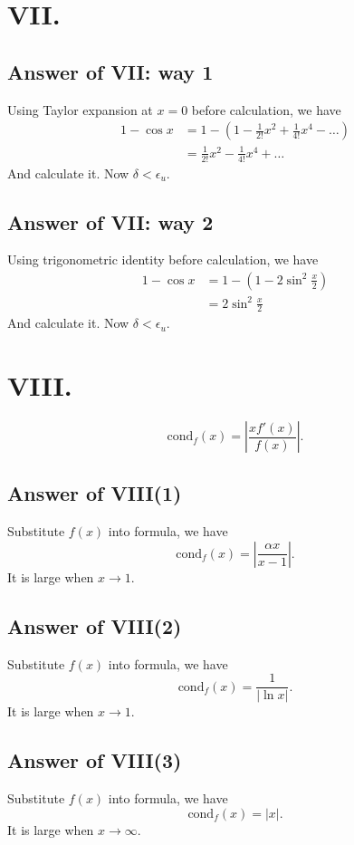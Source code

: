 \documentclass[a4paper]{article}
\begin{document}
\section*{VII.}

\subsection*{Answer of VII: way 1}
Using Taylor expansion at $x=0$ before calculation, we have
\begin{align*}
    1-\cos x&=1-(1-\frac{1}{2!}x^2+\frac{1}{4!}x^4-\ldots)\\
    &=\frac{1}{2!}x^2-\frac{1}{4!}x^4+\ldots
\end{align*}
And calculate it. Now $\delta<\epsilon_u$.

\subsection*{Answer of VII: way 2}
Using trigonometric identity before calculation, we have
\begin{align*}
    1-\cos x&=1-(1-2\sin^2 \frac{x}{2})\\
    &=2\sin^2 \frac{x}{2}
\end{align*}
And calculate it. Now $\delta<\epsilon_u$.

\section*{VIII.}
$$\text{cond}_f(x)=|\frac{xf'(x)}{f(x)}|.$$

\subsection*{Answer of VIII(1)}
Substitute $f(x)$ into formula, we have
$$\text{cond}_f(x)=|\frac{\alpha x}{x-1}|.$$
It is large when $x \to 1$.

\subsection*{Answer of VIII(2)}
Substitute $f(x)$ into formula, we have
$$\text{cond}_f(x)=\frac{1}{|\ln x|}.$$
It is large when $x \to 1$.

\subsection*{Answer of VIII(3)}
Substitute $f(x)$ into formula, we have
$$\text{cond}_f(x)=|x|.$$
It is large when $x \to \infty$.
\end{document}
